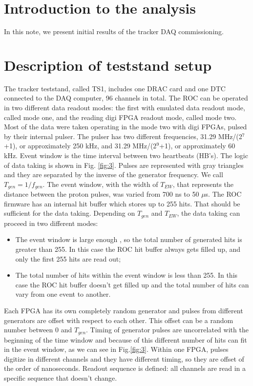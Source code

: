 \section {Introduction to the analysis}

In this note, we present initial results of the tracker DAQ commissioning.
\section{Description of teststand setup}
  The tracker teststand, called TS1, includes one DRAC card and one DTC connected to the DAQ computer, 96 channels in total.
The ROC can be operated in two different data readout modes: the first with
emulated data readout mode, called mode one, and the reading digi FPGA
readout mode, called mode two. Most of the data were taken operating in the mode two with digi FPGAs, pulsed by their internal pulser.
  The pulser has two different frequencies,  31.29 MHz/(2$^7$+1), or approximately 250 kHz, 
and 31.29 MHz/(2$^9$+1), or approximately 60 kHz.
Event window is the time interval between two heartbeats (HB's). 
The logic of data taking is shown in Fig. \ref{fig:3}.
Pulses are represented with gray triangles and 
they are separated by the inverse of the generator frequency. We call $T_{gen}=1/f_{gen}$.
The event window, with the width of $T_{EW}$, that represents the distance between the proton pulses, 
was varied from 700 ns to 50 $\mu$s. 
The ROC firmware has an internal hit buffer which stores up to 255 hits.
That should be sufficient for the data taking.
Depending on $T_{gen}$ and $T_{EW}$, the data taking can proceed in two different modes:
  \begin{itemize}
  \item
    The event window is large enough , so the total number of generated hits is greater than 255. In this case
    the ROC hit buffer always gets filled up, and only the first 255 hits are read out;
  \item
    The total number of hits within the event window is less than 255.
    In this case the ROC hit buffer doesn't get filled up and the total number of hits can vary from one event to another.
  \end{itemize}
Each FPGA has its own completely random generator and pulses from different generators are offset with respect to each other. This offset can be a random number between 0 and $T_{gen}$.
Timing of generator pulses are uncorrelated with the beginning of the time window and because of this different number of hits can fit in the event window, as we can see in Fig.\ref{fig:3}.
Within one FPGA, pulses digitize in different channels and they have different timing, so they are offset of the order of nanoseconds.
Readout sequence is defined: all channels are read in a specific sequence that doesn't change.

